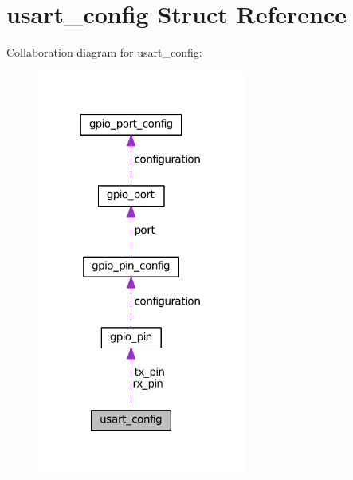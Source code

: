\hypertarget{structusart__config}{}\section{usart\+\_\+config Struct Reference}
\label{structusart__config}


Collaboration diagram for usart\+\_\+config\+:\nopagebreak
\begin{figure}[H]
\begin{center}
\leavevmode
\includegraphics[width=194pt]{structusart__config__coll__graph}
\end{center}
\end{figure}
